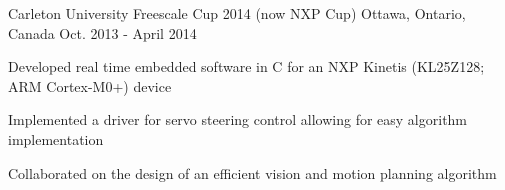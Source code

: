 \begin{cventries}
  \cventry
    {Carleton University} %
    {Freescale Cup 2014 (now NXP Cup)} %
    {Ottawa, Ontario, Canada} %
    {Oct. 2013 - April 2014} %
    {
      \begin{cvitems} %
        \item {Developed real time embedded software in C for an NXP Kinetis (KL25Z128; ARM Cortex-M0+) device}
        \item {Implemented a driver for servo steering control allowing for easy algorithm implementation}
        \item {Collaborated on the design of an efficient vision and motion planning algorithm}
      \end{cvitems}
    }

\end{cventries}
